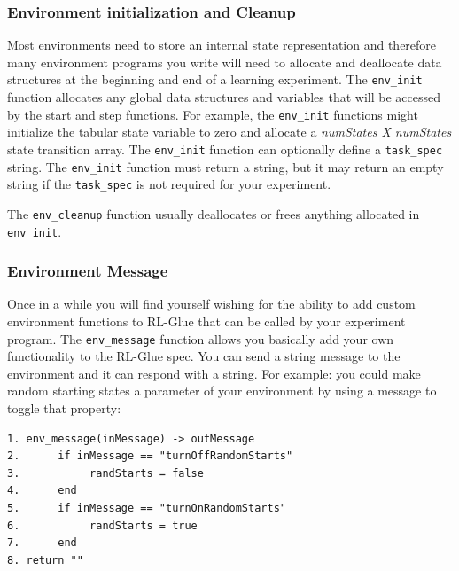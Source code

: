 \documentclass[11pt]{article}
\begin{document}
%

        
\subsubsection{Environment initialization and Cleanup}        
Most environments need to store an internal state representation and therefore many environment programs you write will need to allocate and deallocate data structures at the beginning and end of a learning experiment. The \texttt{env\_init} function allocates any global data structures and variables that will be accessed by the start and step functions. For example, the \texttt{env\_init} functions might initialize the tabular state variable to zero and allocate a {\it numStates X numStates} state transition array. The \texttt{env\_init} function can optionally define a \texttt{task\_spec} string. The \texttt{env\_init} function must return a string, but it may return an empty string if the \texttt{task\_spec} is not required for your experiment.

The \texttt{env\_cleanup} function usually deallocates or frees anything allocated in \texttt{env\_init}.

\subsubsection{Environment Message}
Once in a while you will find yourself wishing for the ability to add custom environment functions to RL-Glue that can be called by your experiment program. The \texttt{env\_message} function allows you basically add your own functionality to the RL-Glue spec. You can send a string message to the environment and it can respond with a string. For example: you could make random starting states a parameter of your environment by using a message to toggle that property:
\begin{verbatim}
1. env_message(inMessage) -> outMessage
2.      if inMessage == "turnOffRandomStarts"  
3.           randStarts = false
4.      end 
5.      if inMessage == "turnOnRandomStarts"  
6.           randStarts = true
7.      end 
8. return ""
\end{verbatim}
\end{document}
